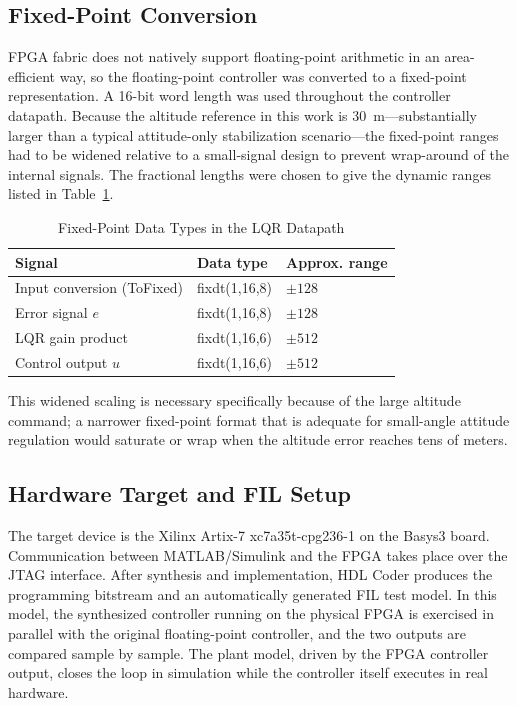 \documentclass[conference]{IEEEtran}
\begin{document}
\subsection{Fixed-Point Conversion}
FPGA fabric does not natively support floating-point arithmetic in an area-efficient way, so the floating-point controller was converted to a fixed-point representation. A 16-bit word length was used throughout the controller datapath. Because the altitude reference in this work is 30~m---substantially larger than a typical attitude-only stabilization scenario---the fixed-point ranges had to be widened relative to a small-signal design to prevent wrap-around of the internal signals. The fractional lengths were chosen to give the dynamic ranges listed in Table~\ref{tab:fixedpoint}.

\begin{table}[!t]
\renewcommand{\arraystretch}{1.3}
\caption{Fixed-Point Data Types in the LQR Datapath}
\label{tab:fixedpoint}
\centering
\begin{tabular}{lll}
\toprule
\textbf{Signal} & \textbf{Data type} & \textbf{Approx. range}\\
\midrule
Input conversion (ToFixed) & fixdt(1,16,8) & $\pm128$\\
Error signal $e$ & fixdt(1,16,8) & $\pm128$\\
LQR gain product & fixdt(1,16,6) & $\pm512$\\
Control output $u$ & fixdt(1,16,6) & $\pm512$\\
\bottomrule
\end{tabular}
\end{table}

This widened scaling is necessary specifically because of the large altitude command; a narrower fixed-point format that is adequate for small-angle attitude regulation would saturate or wrap when the altitude error reaches tens of meters.

\subsection{Hardware Target and FIL Setup}
The target device is the Xilinx Artix-7 xc7a35t-cpg236-1 on the Basys3 board. Communication between MATLAB/Simulink and the FPGA takes place over the JTAG interface. After synthesis and implementation, HDL Coder produces the programming bitstream and an automatically generated FIL test model. In this model, the synthesized controller running on the physical FPGA is exercised in parallel with the original floating-point controller, and the two outputs are compared sample by sample. The plant model, driven by the FPGA controller output, closes the loop in simulation while the controller itself executes in real hardware.
\end{document}
